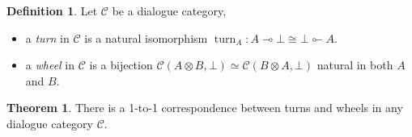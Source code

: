 \documentclass[8pt]{article}
\theoremstyle{definition}
\newtheorem{definition}{Definition}[section]
\theoremstyle{definition}
\newtheorem{theorem}{Theorem}[section]
\theoremstyle{definition}
\theoremstyle{definition}
\theoremstyle{definition}
\theoremstyle{definition}
\theoremstyle{definition}
\theoremstyle{definition}
\theoremstyle{definition}
\theoremstyle{definition}
\theoremstyle{definition}
\theoremstyle{definition}
\theoremstyle{definition}
\theoremstyle{definition}
\theoremstyle{question}
\begin{document}
\begin{definition}
   Let $\mathcal{C}$ be a dialogue category,
  \begin{itemize} 
  \item a \emph{turn} in $\mathcal{C}$ is a natural isomorphism
  $\operatorname{turn}_A : A \multimap \bot \cong \bot \multimapinv A$.
  \item a \emph{wheel} in $\mathcal{C}$ is a bijection $\mathcal{C}(A \otimes B, \bot) \simeq \mathcal{C}(B \otimes A, \bot)$
  natural in both $A$ and $B$. 
  \end{itemize}
\end{definition}

\begin{theorem}
  There is a 1-to-1 correspondence between turns and wheels in any dialogue category $\mathcal{C}$.
\end{theorem}
\end{document}

